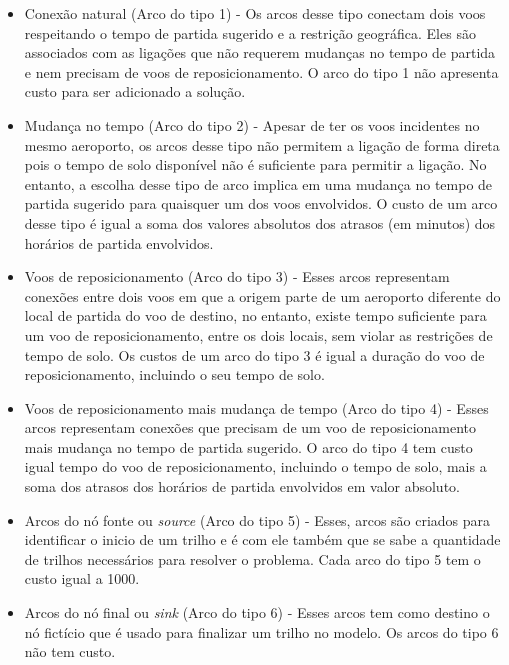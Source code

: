   
  \begin{itemize}
\item Conexão natural (Arco do tipo 1) - Os arcos desse tipo conectam dois voos respeitando o tempo de partida sugerido e
a restrição geográfica. Eles são associados com as ligações que não requerem mudanças no tempo de partida e nem
       precisam de voos de reposicionamento. O arco do tipo 1 não apresenta custo para ser adicionado a solução.

\item Mudança no tempo (Arco do tipo 2) - Apesar de ter os voos incidentes no mesmo aeroporto, os arcos desse tipo não
permitem a ligação de forma direta pois o tempo de solo disponível não é suficiente para permitir a ligação. No
      entanto, a escolha desse tipo de arco implica em uma mudança no tempo de partida sugerido para quaisquer um dos
      voos envolvidos. O custo de um arco desse tipo é igual a soma dos valores absolutos dos atrasos (em minutos) dos
      horários de partida envolvidos.

\item Voos de reposicionamento (Arco do tipo 3) - Esses arcos representam conexões entre dois voos em que a origem
parte de um aeroporto diferente do local de partida do voo de destino, no entanto, existe tempo suficiente para um voo
de reposicionamento, entre os dois locais, sem violar as restrições de tempo de solo. Os custos de um arco do tipo 3 é
  igual a duração do voo de reposicionamento, incluindo o seu tempo de solo.

\item Voos de reposicionamento mais mudança de tempo (Arco do tipo 4) - Esses arcos representam conexões que
precisam de um voo de reposicionamento mais mudança no tempo de partida sugerido. O arco do tipo 4 tem custo
igual tempo do voo de reposicionamento, incluindo o tempo de solo, mais a soma dos atrasos dos horários de partida
envolvidos em valor absoluto.

\item Arcos do nó fonte ou \textit{source} (Arco do tipo 5) - Esses, arcos são criados para identificar o inicio de um trilho e é com
 ele também que se sabe a quantidade de trilhos necessários para resolver o problema. Cada arco do tipo 5 tem o custo
  igual a 1000.

\item Arcos do nó final ou \textit{sink} (Arco do tipo 6) - Esses arcos tem como destino o nó fictício que é usado para finalizar um
  trilho no modelo. Os arcos do tipo 6 não tem custo.


\end{itemize}
  
